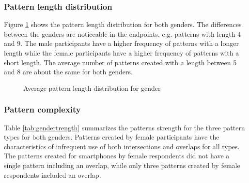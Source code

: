     \clearpage
    \subsubsection{Pattern length distribution}
    Figure \ref{fig:avgpatterndistgender} shows the pattern length distribution for both genders. The differences between the genders are noticeable in the endpoints, e.g. patterns with length 4 and 9. The male participants have a higher frequency of patterns with a longer length while the female participants have a higher frequency of patterns with a short length. The average number of patterns created with a length between 5 and 8 are about the same for both genders. 

    \begin{figure}[H]
    	\centering
    	\caption{Average pattern length distribution for gender}
    	\label{fig:avgpatterndistgender}
    \end{figure}

    \clearpage
    \subsubsection{Pattern complexity}
    Table \ref{tab:gendertrength} summarizes the patterns strength for the three pattern types for both genders. Patterns created by female participants have the characteristics of infrequent use of both intersections and overlaps for all types. The patterns created for  smartphones by female respondents did not have a single pattern including an overlap, while only three patterns created by female respondents included an overlap.


